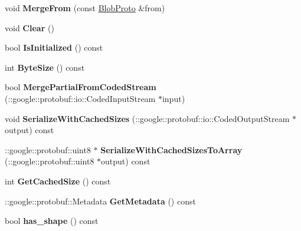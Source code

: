 \begin{DoxyCompactItemize}
void {\bfseries Merge\+From} (const \mbox{\hyperlink{classcaffe_1_1_blob_proto}{Blob\+Proto}} \&from)
\item 
\mbox{\label{classcaffe_1_1_blob_proto_a5b5a9101dd8e3a0b024d8f904c9260d2}} 
void {\bfseries Clear} ()
\item 
\mbox{\label{classcaffe_1_1_blob_proto_abef9f604a7d77b58ae0e3df80ac9d54d}} 
bool {\bfseries Is\+Initialized} () const
\item 
\mbox{\label{classcaffe_1_1_blob_proto_a6d9fc09ab3716be0c2c1c69783d405fa}} 
int {\bfseries Byte\+Size} () const
\item 
\mbox{\label{classcaffe_1_1_blob_proto_a2bcb7a7c77e7ea39ecd8dbf7d8ac4bce}} 
bool {\bfseries Merge\+Partial\+From\+Coded\+Stream} (\+::google\+::protobuf\+::io\+::\+Coded\+Input\+Stream $\ast$input)
\item 
\mbox{\label{classcaffe_1_1_blob_proto_a00448161800f3378d4e0c6c13ab71c6f}} 
void {\bfseries Serialize\+With\+Cached\+Sizes} (\+::google\+::protobuf\+::io\+::\+Coded\+Output\+Stream $\ast$output) const
\item 
\mbox{\label{classcaffe_1_1_blob_proto_a9dfa296b31964f3d5ce5b482afdfbae7}} 
\+::google\+::protobuf\+::uint8 $\ast$ {\bfseries Serialize\+With\+Cached\+Sizes\+To\+Array} (\+::google\+::protobuf\+::uint8 $\ast$output) const
\item 
\mbox{\label{classcaffe_1_1_blob_proto_a11d1e9ed06b1ab948959e6a6326609d7}} 
int {\bfseries Get\+Cached\+Size} () const
\item 
\mbox{\label{classcaffe_1_1_blob_proto_aa94b1541c8e093577c99be326021208e}} 
\+::google\+::protobuf\+::\+Metadata {\bfseries Get\+Metadata} () const
\item 
\mbox{\label{classcaffe_1_1_blob_proto_a7fd496dfe2a2e5d1e4f8eb1400299bdd}} 
bool {\bfseries has\+\_\+shape} () const
\item 
\mbox{\label{classcaffe_1_1_blob_proto_a60ded92d2f07fe8847ee681c3a262240}} 

\end{DoxyCompactItemize}
